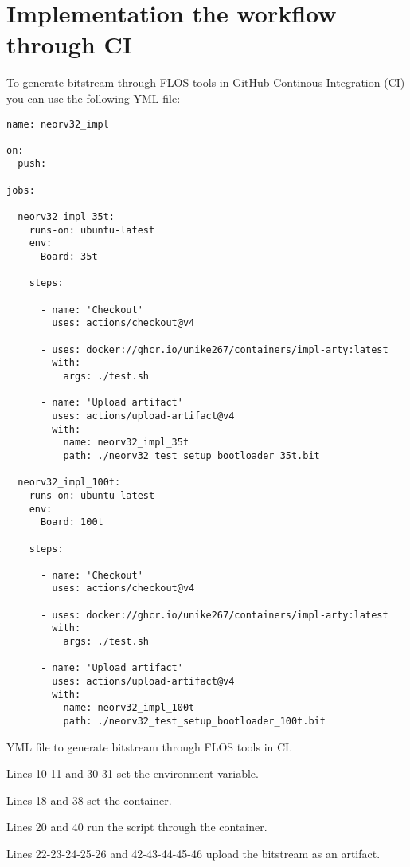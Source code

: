 \section{Implementation the workflow through CI}

\label{ci}

To generate bitstream through FLOS tools in GitHub Continous Integration (CI) you can use the following YML file:

\begin{code}
\begin{verbatim}
name: neorv32_impl

on:
  push:

jobs:

  neorv32_impl_35t:
    runs-on: ubuntu-latest
    env:
      Board: 35t

    steps:

      - name: 'Checkout'
        uses: actions/checkout@v4

      - uses: docker://ghcr.io/unike267/containers/impl-arty:latest
        with:
          args: ./test.sh
      
      - name: 'Upload artifact'
        uses: actions/upload-artifact@v4
        with:
          name: neorv32_impl_35t
          path: ./neorv32_test_setup_bootloader_35t.bit

  neorv32_impl_100t:
    runs-on: ubuntu-latest
    env:
      Board: 100t

    steps:

      - name: 'Checkout'
        uses: actions/checkout@v4

      - uses: docker://ghcr.io/unike267/containers/impl-arty:latest
        with:
          args: ./test.sh
      
      - name: 'Upload artifact'
        uses: actions/upload-artifact@v4
        with:
          name: neorv32_impl_100t
          path: ./neorv32_test_setup_bootloader_100t.bit
\end{verbatim}
\caption{YML file to generate bitstream through FLOS tools in CI.}
\label{cod:7}
\end{code}

\vspace{3mm}

\noindent Lines 10-11 and 30-31 set the environment variable.

\vspace{3mm}

\noindent Lines 18 and 38 set the container.

\vspace{3mm}

\noindent Lines 20 and 40 run the script through the container.

\vspace{3mm}

\noindent Lines 22-23-24-25-26 and 42-43-44-45-46 upload the bitstream as an artifact.

